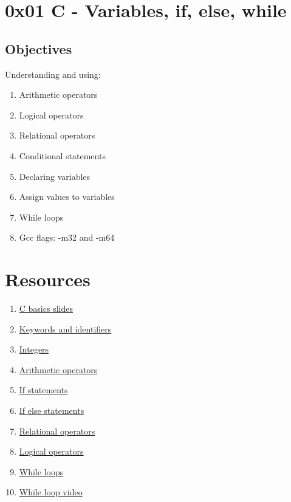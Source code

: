 \documentclass[12pt, letterpaper]{report}
\begin{document}
\chapter{0x01 C - Variables, if, else, while}
\section{Objectives}
Understanding and using:
\begin{enumerate}
	\item Arithmetic operators
	\item Logical operators
	\item Relational operators
	\item Conditional statements
	\item Declaring variables
	\item Assign values to variables
	\item While loops
	\item Gcc flags: -m32 and -m64
\end{enumerate}

\chapter{Resources}
\begin{enumerate}
	\item \href{https://s3.amazonaws.com/alx-intranet.hbtn.io/uploads/misc/2022/4/e0ccf91eec6b977a9e00ed384dc285df9c2772e3.pdf?X-Amz-Algorithm=AWS4-HMAC-SHA256&X-Amz-Credential=AKIARDDGGGOUSBVO6H7D%2F20230519%2Fus-east-1%2Fs3%2Faws4_request&X-Amz-Date=20230519T061618Z&X-Amz-Expires=86400&X-Amz-SignedHeaders=host&X-Amz-Signature=014bb1a91a87b5e166ddab77046fced5092d55a626bd204e5c8c573761b37fda}{C basics slides}
	\item \href{https://publications.gbdirect.co.uk//c_book/chapter2/keywords_and_identifiers.html}{Keywords and identifiers}
	\item \href{https://publications.gbdirect.co.uk//c_book/chapter2/integral_types.html}{Integers}
	\item \href{https://www.tutorialspoint.com/cprogramming/c_arithmetic_operators.htm}{Arithmetic operators}
	\item \href{https://www.cprogramming.com/tutorial/c/lesson2.html}{If statements}
	\item \href{https://www.tutorialspoint.com/cprogramming/if_else_statement_in_c.htm}{If else statements}
	\item \href{https://www.tutorialspoint.com/cprogramming/c_relational_operators.htm}{Relational operators}
	\item \href{https://www.fresh2refresh.com/c-programming/c-operators-expressions/c-logical-operators/}{Logical operators}
	\item \href{https://www.tutorialspoint.com/cprogramming/c_while_loop.htm}{While loops}
	\item \href{https://www.youtube.com/watch?v=Ju1LYO9pkaI}{While loop video}
\end{enumerate}
\end{document}
